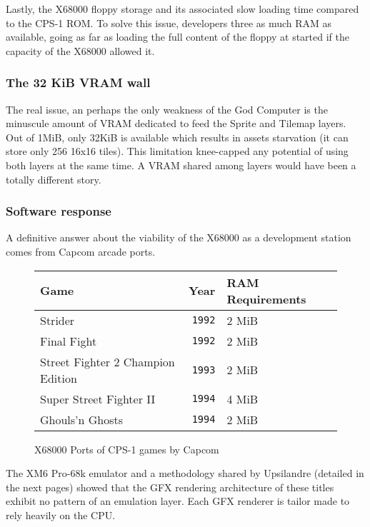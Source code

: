 Lastly, the X68000 floppy storage and its associated slow loading time compared to the CPS-1 ROM. To solve this issue, developers three as much RAM as available, going as far as loading the full content of the floppy at started if the capacity of the X68000 allowed it.



\subsubsection{The 32 KiB VRAM wall}

The real issue, an perhaps the only weakness of the God Computer is the minuscule amount of VRAM dedicated to feed the Sprite and Tilemap layers. Out of 1MiB, only 32KiB is available which results in assets starvation (it can store only  256 16x16 tiles). This limitation knee-capped any potential of using both layers at the same time. A VRAM shared among layers would have been a totally different story.

\subsubsection{Software response}

A definitive answer about the viability of the X68000 as a development station comes from Capcom arcade ports.
\begin{figure}[H]
\label{x68000-specs}
\begin{tabularx}{\textwidth}{lrY}
  \toprule    
  \textbf{Game } & \textbf{Year}  & \textbf{RAM Requirements } \\               
  \toprule   
  Strider & \texttt{1992} &  2 MiB \\
  Final Fight & \texttt{1992} &  2 MiB \\
  Street Fighter 2 Champion Edition & \texttt{1993} &  2 MiB \\
  Super Street Fighter II & \texttt{1994} &  4 MiB \\
  Ghouls'n Ghosts & \texttt{1994} &  2 MiB \\
    \toprule   
\end{tabularx}
\caption*{X68000 Ports of CPS-1 games by Capcom}
\end{figure}

The XM6 Pro-68k emulator and a methodology shared by Upsilandre\cite{x68k_games_analysis} (detailed in the next pages) showed that the GFX rendering architecture of these titles exhibit no pattern of an emulation layer. Each GFX renderer is tailor made to rely heavily on the CPU. 

